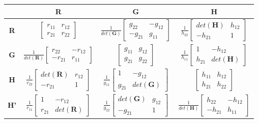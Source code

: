 \documentclass[a4paper,twocolumn,10pt]{article}
\begin{document}
{\small\begin{tabular}{@{}|@{}c@{}|@{}c@{}|@{}c@{}|@{}c@{}|}
\hline & \textbf{R} & \textbf{G} & \textbf{H}\\
\hline \textbf{R} & $\begin{bmatrix}r_{11} & r_{12}\\ r_{21} & r_{22}\end{bmatrix}$ & $\frac{1}{det(\textbf{G})}\begin{bmatrix}g_{22} & -g_{12}\\ -g_{21} & g_{11}\end{bmatrix}$ & $\frac{1}{h_{22}}\begin{bmatrix}det(\textbf{H}) & h_{12}\\ -h_{21} & 1\end{bmatrix}$\\
\hline \textbf{G} & $\frac{1}{det(\textbf{R})}\begin{bmatrix}r_{22} & -r_{12}\\ -r_{21} & r_{11}\end{bmatrix}$ & $\begin{bmatrix}g_{11} & g_{12}\\ g_{21} & g_{22}\end{bmatrix}$ & $\frac{1}{h_{11}}\begin{bmatrix}1 & -h_{12}\\ h_{21} & det(\textbf{H})\end{bmatrix}$\\
\hline \textbf{H} & $\frac{1}{r_{22}}\begin{bmatrix}det(\textbf{R}) & r_{12}\\ -r_{21} & 1\end{bmatrix}$ & $\frac{1}{g_{11}}\begin{bmatrix}1 & -g_{12}\\ g_{21} & det(\textbf{G})\end{bmatrix}$ & $\begin{bmatrix}h_{11} & h_{12}\\ h_{21} & h_{22}\end{bmatrix}$\\
\hline \textbf{H'} & $\frac{1}{r_{11}}\begin{bmatrix}1 & -r_{12}\\ r_{21} & det(\textbf{R})\end{bmatrix}$ & $\frac{1}{g_{22}}\begin{bmatrix}det(\textbf{G}) & g_{12}\\ -g_{21} & 1\end{bmatrix}$ & $\frac{1}{det(\textbf{H})}\begin{bmatrix}h_{22} & -h_{12}\\ -h_{21} & h_{11}\end{bmatrix}$\\

\end{tabular}}
\end{document}
